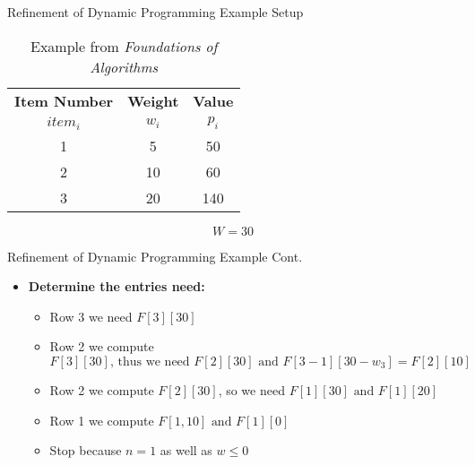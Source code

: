 \documentclass{beamer}
\begin{document}
	\begin{frame}{Refinement of Dynamic Programming Example Setup}
		\begin{table}[h!]
			\begin{center}
				\caption{Example from \textit{Foundations of Algorithms} \cite{neopolitan_foundations_nodate}}
				\label{tab:example3}
				\begin{tabular}{c|c|c}
					\toprule %
					\textbf{Item Number} & \textbf{Weight} & \textbf{Value}\\
					$item_i$ & $w_i$ & $p_i$ \\
					\midrule %
					1 & 5 & 50 \\
					2 & 10 & 60 \\
					3 & 20 & 140 \\ 
				\end{tabular}
			\end{center} \vspace{12pt}
			$$
			W = 30
			$$
		\end{table}
	\end{frame}

	\begin{frame}{Refinement of Dynamic Programming Example Cont.}
		\begin{itemize}
			\item \textbf{Determine the entries need:} 
				\begin{itemize}
					\item Row 3 we need $F[3][30]$
					\item Row 2 we compute $F[3][30] \mbox{, thus we need } F[2][30] \mbox{ and } F[3-1][30-w_3] = F[2][10]$
					\item Row 2 we compute $F[2][30]$, so we need $F[1][30] \mbox{ and } F[1][20]$ 
					\item Row 1 we compute $F[1, 10] \mbox{ and } F[1][0]$
					\item Stop because $n = 1$ as well as $w \leq 0$
				\end{itemize}
		\end{itemize}
	\end{frame}
\end{document}
